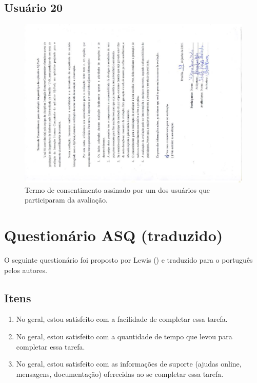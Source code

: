 \begin{anexosenv}
    \section*{Usuário 20}
    \begin{figure}[!htbp]
      \centering
      \includegraphics[scale=0.6, angle=-90]{editaveis/figuras/matheus_alves}
      \caption{Termo de consentimento assinado por um dos usuários que participaram da avaliação.}
      \label{termo_consentimento_1}
    \end{figure}
	
	
  \chapter{Questionário ASQ (traduzido)}
      
      O seguinte questionário foi proposto por Lewis (\citeyear{lewis91}) e traduzido para o português pelos autores.
      
      \section*{Itens}
	
	\begin{enumerate}
	  \item No geral, estou satisfeito com a facilidade de completar essa tarefa.
	  \item No geral, estou satisfeito com a quantidade de tempo que levou para completar essa tarefa.
	  \item No geral, estou satisfeito com as informações de suporte (ajudas online, mensagens, documentação)
	    oferecidas ao se completar essa tarefa.
	\end{enumerate}
      

\end{anexosenv}
